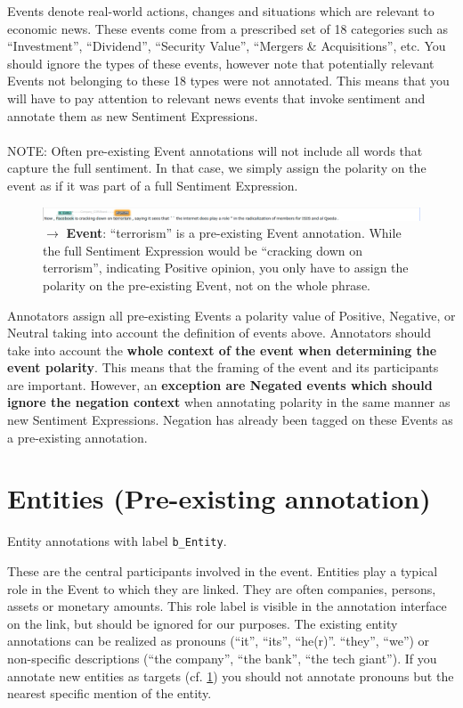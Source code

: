 Events denote real-world actions, changes and situations which are relevant to economic news.
These events come from a prescribed set of 18 categories such as ``Investment'', ``Dividend'', ``Security Value'', ``Mergers \& Acquisitions'', etc. 
You should ignore the types of these events, however note that potentially relevant Events not belonging to these 18 types were not annotated.
This means that you will have to pay attention to relevant news events that invoke sentiment and annotate them as new Sentiment Expressions.\\\\
\noindent
\textcolor{BrickRed}{NOTE: Often pre-existing Event annotations will not include all words that capture the full sentiment.
In that case, we simply assign the polarity on the event as if it was part of a full Sentiment Expression.}
\begin{figure}[h]
    \centering
    \includegraphics[width=\textwidth]{img/fb03 incomplemte event trigger example.png}
    \caption*{$\rightarrow$ \textbf{Event}: ``terrorism'' is a pre-existing Event annotation. While the full Sentiment Expression would be ``cracking down on terrorism'', indicating Positive opinion, you only have to assign the polarity on the pre-existing Event, not on the whole phrase.}
\end{figure}

Annotators assign all pre-existing Events a polarity value of Positive, Negative, or Neutral taking into account the definition of events above.
Annotators should take into account the \textbf{whole context of the event when determining the event polarity}.
This means that the framing of the event and its participants are important. However, an \textbf{exception are Negated events which should ignore the negation context} when annotating polarity in the same manner as new Sentiment Expressions. Negation has already been tagged on these Events as a pre-existing annotation.

\section{Entities (Pre-existing annotation)}
\label{sec:entitydefinition}
\entitycolor Entity annotations with label \texttt{b\_Entity}.
    
These are the central participants involved in the event.
Entities play a typical role in the Event to which they are linked.
They are often companies, persons, assets or monetary amounts.
This role label is visible in the annotation interface on the link, but should be ignored for our purposes.
The existing entity annotations can be realized as pronouns (``it'', ``its'', ``he(r)''. ``they'', ``we'') or non-specific descriptions (``the company'', ``the bank'', ``the tech giant'').
If you annotate new entities as targets (cf. \ref{sec:entitydefinition}) you should not annotate pronouns but the nearest specific mention of the entity.


